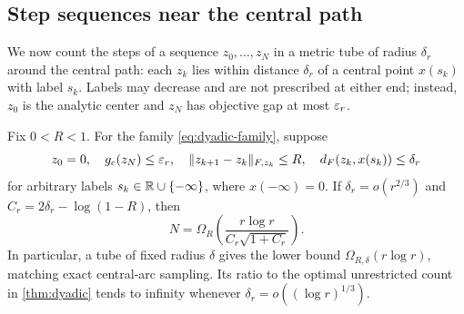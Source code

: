 \subsection{Step sequences near the central path}
We now count the steps of a sequence $z_0,\ldots,z_N$ in a metric tube
of radius $\delta_r$ around the central path: each $z_k$ lies within
distance $\delta_r$ of a central point $x(s_k)$ with label $s_k$.
Labels may decrease and are not prescribed at either end; instead,
$z_0$ is the analytic center and $z_N$ has objective gap at most
$\varepsilon_r$.

\begin{theorem}
\label{thm:tube}
Fix $0<R<1$. For the family \eqref{eq:dyadic-family}, suppose
\begin{equation}
 z_0=0,\quad g_c(z_N)\leq\varepsilon_r,\quad
 \lVert z_{k+1}-z_k\rVert_{F,z_k}\leq R,\quad
 d_F(z_k,x(s_k))\leq\delta_r
 \label{eq:tube-contract}
\end{equation}
for arbitrary labels $s_k\in\mathbb R\cup\{-\infty\}$, where
$x(-\infty)=0$. If $\delta_r=o(r^{2/3})$ and
$C_r=2\delta_r-\log(1-R)$, then
\begin{equation}
 N=\Omega_R\left(\frac{r\log r}{C_r\sqrt{1+C_r}}\right).
 \label{eq:growing-tube}
\end{equation}
In particular, a tube of fixed radius $\delta$ gives the lower bound
$\Omega_{R,\delta}(r\log r)$, matching exact central-arc sampling. Its
ratio to the optimal unrestricted count in \cref{thm:dyadic} tends to
infinity whenever $\delta_r=o((\log r)^{1/3})$.
\end{theorem}
